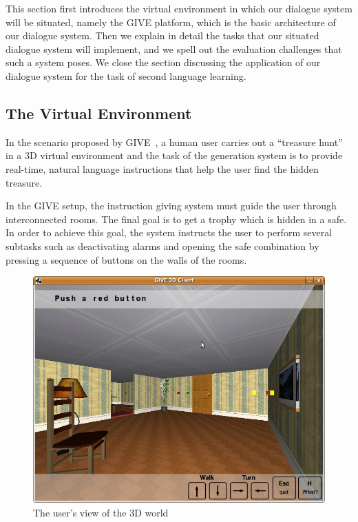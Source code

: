 This section first introduces the virtual environment in which our dialogue
system will be situated, namely the GIVE platform, which is the basic architecture of our dialogue system.  
Then we explain in detail the tasks that our situated dialogue system will
implement, and we spell out the evaluation challenges that such a system
poses. We close the section discussing the application of our dialogue system
for the task of second language learning. 

\subsection{The Virtual Environment}

In the scenario proposed by GIVE~\cite{byron09}, a
human user carries out a ``treasure hunt'' in a 3D virtual environment
and the task of the generation system is to provide real-time, natural
language instructions that help the user find the hidden treasure.

In the GIVE setup, the instruction giving system must guide the user
through interconnected rooms. The final
goal  is to get a trophy which is hidden in a safe. In
order to achieve this goal, the system instructs the user to perform
several subtasks such as deactivating alarms and opening the safe
combination by pressing a sequence of buttons on the walls of the
rooms. 

\begin{figure}[h]
\begin{center}
\includegraphics[width=1\linewidth]{give-3D.jpg} 
\end{center}
\caption{The user's view of the 3D world\label{3d-world}}
\end{figure}

